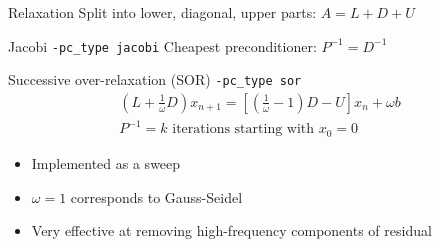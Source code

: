 \begin{frame}{Relaxation}
  Split into lower, diagonal, upper parts: \alert{$ A = L + D + U $}
  \begin{block}{Jacobi \texttt{-pc\_type jacobi}}
    Cheapest preconditioner: $P^{-1} = D^{-1}$
  \end{block}
  \begin{block}{Successive over-relaxation (SOR) \texttt{-pc\_type sor}}
    \begin{gather*}
      \left(L + \frac 1 \omega D\right) x_{n+1} = \left[\left(\frac
          1\omega-1\right)D - U\right] x_n + \omega b \\
      P^{-1} = \text{$k$ iterations starting with $x_0=0$}
    \end{gather*}
    \begin{itemize}
    \item Implemented as a sweep
    \item $\omega = 1$ corresponds to Gauss-Seidel
    \item Very effective at removing high-frequency components of residual
    \end{itemize}
  \end{block}
\end{frame}


